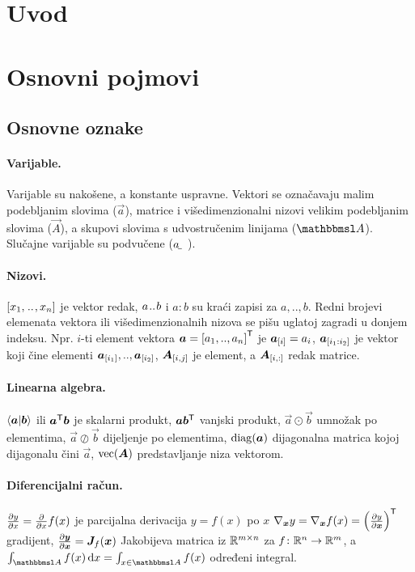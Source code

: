 \documentclass[oneside]{book}
\begin{document}
\section{Uvod}



\section{Osnovni pojmovi}

\subsection{Osnovne oznake}

\paragraph{Varijable.} Varijable su nakošene, a konstante uspravne. Vektori se označavaju malim podebljanim slovima ($\vec a$), matrice i višedimenzionalni nizovi velikim podebljanim slovima ($\vec A$), a skupovi slovima s udvostručenim linijama ($\set A$). Slučajne varijable su podvučene ($\rvar a$).

\paragraph{Nizovi.} $\sbr{x_1,\bidot, x_n}$ je vektor redak, $a\mkern1.5mu{..}\mkern1.5mu b$ i $a:b$ su kraći zapisi za $a,..,b$. Redni brojevi elemenata vektora ili višedimenzionalnih nizova se pišu uglatoj zagradi u donjem indeksu. Npr. $i$-ti element vektora $\vec a=\sbr{a_1,.., a_n}^\tp$ je $\vec a_\ind{i}=a_i$,
$\vec{a}_\ind{i_1:i_2}$ je vektor koji čine elementi $\vec{a}_\ind{i_1},.., \vec{a}_{\sbr{i_2}}$,
$\vec{A}_\ind{i,j}$ je element, a $\vec{A}_\ind{i,:}$ redak matrice.

\paragraph{Linearna algebra.}
$\braket{\vec a}{\vec b}$ ili $\vec{a}^\tp\vec{b}$ je skalarni produkt, $\vec{a}\vec{b}^\tp$ vanjski produkt, $\vec a \odot \vec b$ umnožak po elementima, 
$\vec a \oslash \vec b$ dijeljenje po elementima, $\diag\del{\vec{a}}$ dijagonalna matrica kojoj dijagonalu čini $\vec a$, 
$\vecfunc(\vec A)$ predstavljanje niza vektorom.

\paragraph{Diferencijalni račun.} $\tpd{y}{x}=\tpd{}{x}f(x)$ je parcijalna derivacija $y=f(x)$ po $x$
$\nabla_{\vec x}{y}=\nabla_{\vec x}{f(x)}=\del{\tpd{y}{\vec x}}^\tp$	
gradijent,
$\tpd{\vec y}{\vec x}=\vec J_{f}(\vec x)$ Jakobijeva matrica iz $\mathbb{R}^{m\times n}$ za $f \colon \mathbb{R}^n \to \mathbb{R}^m$, a 
$\int_{\set A}f(x)\dif x=\int_{x\in\set A}f(x)$
određeni integral.
\end{document}
